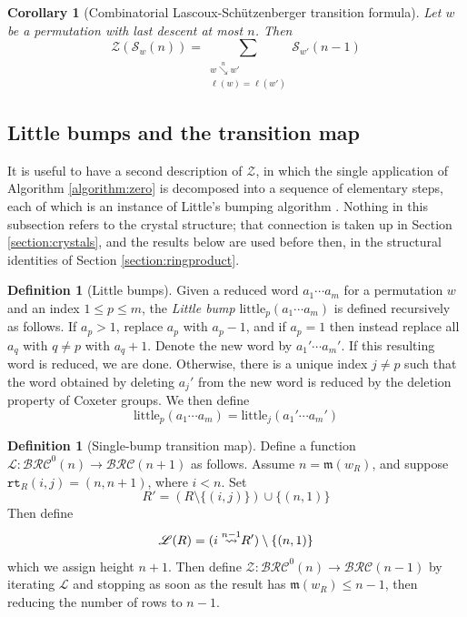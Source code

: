 \documentclass{amsart}
\newtheorem{corollary}[lemma]{Corollary}
\theoremstyle{definition}
\newtheorem{definition}[lemma]{Definition}
\theoremstyle{remark}
\numberwithin{equation}{subsection}
\newcommand{\downvar}[1]{\stackrel{#1}{\searrow}}
\newcommand{\wof}[1]{w_{#1}}
\newcommand{\rtt}{\mathtt{rt}}
\newcommand{\zeromap}{\mathcal{Z}}
\newcommand{\BRC}{\mathcal{BRC}}
\newcommand{\lzeromap}{\mathscr{Z}}
\newcommand{\lmap}{\mathscr{L}}
\newcommand{\ltb}{\mathrm{little}}
\newcommand{\maxd}{\mathfrak{m}}
\begin{document}
\begin{corollary}[Combinatorial Lascoux-Sch\"utzenberger transition formula]
	Let $w$ be a permutation with last descent at most $n$. Then
	$$\zeromap(\mathcal{S}_w(n))=\sum_{\substack{w\downvar{n} w'\\\ell(w)=\ell(w')}}\mathcal{S}_{w'}(n-1)$$
\end{corollary}

\subsection{Little bumps and the transition map}\label{section:littlebump}

It is useful to have a second description of $\zeromap$, in which the single application of Algorithm \ref{algorithm:zero} is decomposed into a sequence of elementary steps, each of which is an instance of Little's bumping algorithm \cite{little2003combinatorial}. Nothing in this subsection refers to the crystal structure; that connection is taken up in Section \ref{section:crystals}, and the results below are used before then, in the structural identities of Section \ref{section:ringproduct}.

\begin{definition}[Little bumps]\label{definition:littlebump}
  Given a reduced word $a_1\cdots a_m$ for a permutation $w$ and an index $1\leq p\leq m$, the \emph{Little bump} $\ltb_p(a_1\cdots a_m)$ is defined recursively as follows. If $a_p>1$, replace $a_p$ with $a_p-1$, and if $a_p=1$ then instead replace all $a_q$ with $q\neq p$ with $a_q+1$. Denote the new word by $a_1'\cdots a_m'$. If this resulting word is reduced, we are done. Otherwise, there is a unique index $j\neq p$ such that the word obtained by deleting $a_j'$ from the new word is reduced by the deletion property of Coxeter groups. We then define
  $$\ltb_p(a_1\cdots a_m) = \ltb_j(a_1'\cdots a_m')$$
\end{definition}

\begin{definition}[Single-bump transition map]\label{definition:lmap}
Define a function $\lmap:\BRC^0(n)\to\BRC(n+1)$ as follows. Assume $n=\maxd(\wof{R})$, and suppose $\rtt_R(i, j) = (n, n + 1)$, where $i < n$. Set 
$$R'= (R\setminus \{(i, j)\})\cup \{(n,1)\}$$
Then define
$$\lmap(R) = (\ins{n-1}{i} R')\setminus\{(n, 1)\}$$
which we assign height $n+1$. Then define $\lzeromap:\BRC^0(n)\to \BRC(n-1)$ by iterating $\lmap$ and stopping as soon as the result has $\maxd(\wof{R})\leq n-1$, then reducing the number of rows to $n-1$.
\end{definition}
\end{document}
